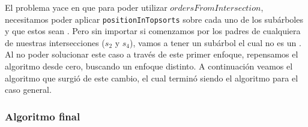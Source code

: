 El problema yace en que para poder utilizar $ordersFromIntersection$, necesitamos poder aplicar \texttt{positionInTopsorts} sobre cada uno de los subárboles y que estos sean \dtrees. Pero sin importar si comenzamos por los padres de cualquiera de nuestras intersecciones ($s_2$ y $s_4$), vamos a tener un subárbol el cual no es un \dtree. Al no poder solucionar este caso a través de este primer enfoque, repensamos el algoritmo desde cero, buscando un enfoque distinto. A continuación veamos el algoritmo que surgió de este cambio, el cual terminó siendo el algoritmo para el caso general. 


\subsubsection{Algoritmo final}

